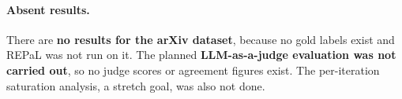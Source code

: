 \paragraph{Absent results.} There are \textbf{no results for the arXiv dataset}, because no gold labels exist and REPaL was not run on it. The planned \textbf{LLM-as-a-judge evaluation was not carried out}, so no judge scores or agreement figures exist. The per-iteration saturation analysis, a stretch goal, was also not done.
